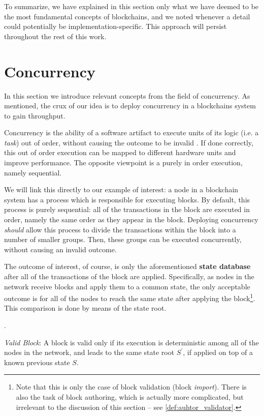 To summarize, we have explained in this section only what we have deemed to be the most fundamental
concepts of blockchains, and we noted whenever a detail could potentially be
implementation-specific. This approach will persist throughout the rest of this work.

\section{Concurrency} \label{chap_bg:sec:concurrency}

In this section we introduce relevant concepts from the field of concurrency. As mentioned, the crux
of our idea is to deploy concurrency in a blockchains system to gain throughput.

Concurrency is the ability of a software artifact to execute units of its logic (i.e. a
\textit{task}) out of order, without causing the outcome to be invalid
\cite{lamportTimeClocksOrdering1978}. If done correctly, this out of order execution can be mapped
to different hardware units and improve performance. The opposite viewpoint is a purely in order
execution, namely sequential.

We will link this directly to our example of interest: a node in a blockchain system has a process
which is responsible for executing blocks. By default, this process is purely sequential: all of the
transactions in the block are executed in order, namely the same order as they appear in the block.
Deploying concurrency \textit{should} allow this process to divide the transactions within the block
into a number of smaller groups. Then, these groups can be executed concurrently, without causing an
invalid outcome.

The outcome of interest, of course, is only the aforementioned \textbf{state database} after all of
the transactions of the block are applied. Specifically, as nodes in the network receive blocks and
apply them to a common state, the only acceptable outcome is for all of the nodes to reach the same
state after applying the block\footnote{Note that this is only the case of block validation (block
\textit{import}). There is also the task of block authoring, which is actually more complicated, but
irrelevant to the discussion of this section -- see \ref{def:auhtor_validator}.}. This comparison is
done by means of the state root.

.

\begin{definition} \label{def:valid_block} \textit{Valid Block}: A block is valid only if its
	execution is deterministic among all of the nodes in the network, and leads to the same state
	root $S^{'}$, if applied on top of a known previous state $S$.
\end{definition}

